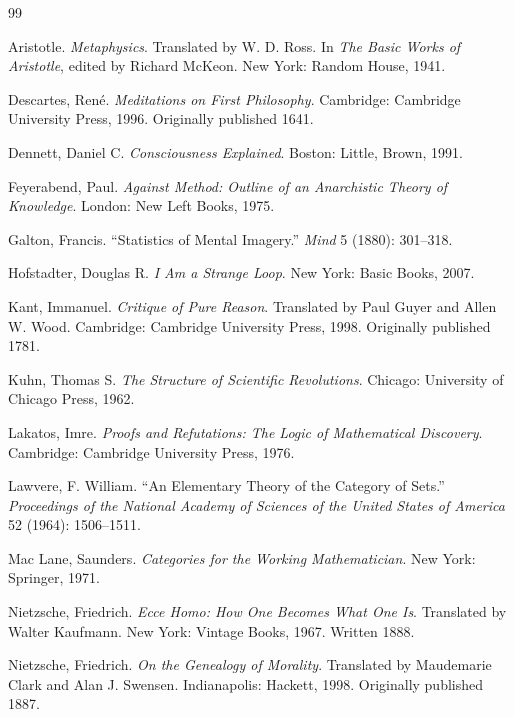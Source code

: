 \documentclass[11pt,openany,twoside]{book}
\theoremstyle{plain}
\theoremstyle{definition}
\theoremstyle{remark}
\begin{document}
\begin{thebibliography}{99}

 Aristotle. \emph{Metaphysics}. Translated by W. D. Ross. In \emph{The Basic Works of Aristotle}, edited by Richard McKeon. New York: Random House, 1941.

 Descartes, Ren\'e. \emph{Meditations on First Philosophy}. Cambridge: Cambridge University Press, 1996. Originally published 1641.

 Dennett, Daniel C. \emph{Consciousness Explained}. Boston: Little, Brown, 1991.

 Feyerabend, Paul. \emph{Against Method: Outline of an Anarchistic Theory of Knowledge}. London: New Left Books, 1975.

 Galton, Francis. ``Statistics of Mental Imagery.'' \emph{Mind} 5 (1880): 301--318.

 Hofstadter, Douglas R. \emph{I Am a Strange Loop}. New York: Basic Books, 2007.

 Kant, Immanuel. \emph{Critique of Pure Reason}. Translated by Paul Guyer and Allen W. Wood. Cambridge: Cambridge University Press, 1998. Originally published 1781.

 Kuhn, Thomas S. \emph{The Structure of Scientific Revolutions}. Chicago: University of Chicago Press, 1962.

 Lakatos, Imre. \emph{Proofs and Refutations: The Logic of Mathematical Discovery}. Cambridge: Cambridge University Press, 1976.

 Lawvere, F. William. ``An Elementary Theory of the Category of Sets.'' \emph{Proceedings of the National Academy of Sciences of the United States of America} 52 (1964): 1506--1511.

 Mac Lane, Saunders. \emph{Categories for the Working Mathematician}. New York: Springer, 1971.

 Nietzsche, Friedrich. \emph{Ecce Homo: How One Becomes What One Is}. Translated by Walter Kaufmann. New York: Vintage Books, 1967. Written 1888.

 Nietzsche, Friedrich. \emph{On the Genealogy of Morality}. Translated by Maudemarie Clark and Alan J. Swensen. Indianapolis: Hackett, 1998. Originally published 1887.


\end{thebibliography}
\end{document}
